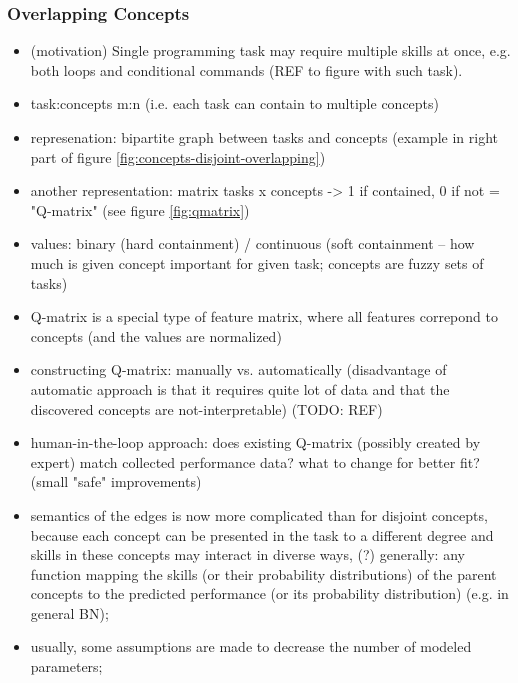 \subsubsection{\textbf{Overlapping Concepts}}
\begin{itemize}
\item (motivation) Single programming task may require multiple skills
  at once, e.g. both loops and conditional commands (REF to figure with such task).
\item task:concepts m:n (i.e. each task can contain to multiple concepts)
\item represenation: bipartite graph between tasks and concepts
  (example in right part of figure \ref{fig:concepts-disjoint-overlapping})
\item another representation: matrix tasks x concepts -> 1 if contained, 0 if
  not = "Q-matrix" (see figure \ref{fig:qmatrix})
\item values: binary (hard containment) / continuous (soft containment --
  how much is given concept important for given task; concepts are fuzzy sets of tasks)
\item Q-matrix is a special type of feature matrix, where all features correpond to concepts
  (and the values are normalized)
\item constructing Q-matrix: manually vs. automatically
  (disadvantage of automatic approach is that it requires quite lot of data and
    that the discovered concepts are not-interpretable) (TODO: REF)
\item human-in-the-loop approach: does existing Q-matrix (possibly created by
  expert) match collected performance data? what to change for better fit?
    (small "safe" improvements)
\item semantics of the edges is now more complicated than for disjoint concepts,
  because each concept can be presented in the task to a different degree
  and skills in these concepts may interact in diverse ways,
  (?) generally: any function mapping the skills (or their probability
    distributions) of the parent concepts to the predicted performance (or its
    probability distribution) (e.g. in general BN);
\item usually, some assumptions are made to decrease the number of modeled parameters;

\end{itemize}
